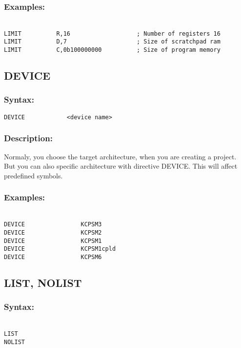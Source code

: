         \subsubsection{Examples:}
        {
            ~\\
            \usecodefont
            \verb'LIMIT          R,16                   ; Number of registers 16'\\
            \verb'LIMIT          D,7                    ; Size of scratchpad ram   '\\
            \verb'LIMIT          C,0b100000000          ; Size of program memory '\\
        }

    \subsection{DEVICE}
        \subsubsection{Syntax:}
        \verb'DEVICE            <device name>'

        \subsubsection{Description:}
        Normaly, you choose the target architecture, when you are creating a project. But you can also specific architecture with directive DEVICE.
        This will affect predefined symbols.

        \subsubsection{Examples:}
        {
            ~\\
            \usecodefont
            \verb'DEVICE                KCPSM3'\\
            \verb'DEVICE                KCPSM2'\\
            \verb'DEVICE                KCPSM1'\\
            \verb'DEVICE                KCPSM1cpld'\\
            \verb'DEVICE                KCPSM6'\\
        }

    \subsection{LIST, NOLIST}
        \subsubsection{Syntax:}
        {
            ~\\
            \usecodefont
            \verb'LIST'\\
            \verb'NOLIST'
        }

